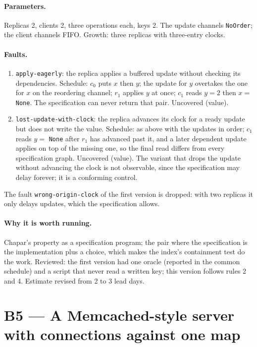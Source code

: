 \documentclass[11pt,a4paper]{article}
\newcommand{\code}[1]{\texttt{#1}}
\begin{document}
\paragraph{Parameters.} Replicas 2, clients 2, three operations each, keys 2. The update
channels \code{NoOrder}; the client channels FIFO. Growth: three replicas with three-entry clocks.

\paragraph{Faults.}
\begin{enumerate}
  \item \code{apply-eagerly}: the replica applies a buffered update without checking its
        dependencies. Schedule: $c_0$ puts $x$ then $y$; the update for $y$ overtakes the one
        for $x$ on the reordering channel; $r_1$ applies $y$ at once; $c_1$ reads $y = 2$ then
        $x = $ \code{None}. The specification can never return that pair. Uncovered (value).
  \item \code{lost-update-with-clock}: the replica advances its clock for a ready update but
        does not write the value. Schedule: as above with the updates in order; $c_1$ reads
        $y = $ \code{None} after $r_1$ has advanced past it, and a later dependent update applies
        on top of the missing one, so the final read differs from every specification graph.
        Uncovered (value). The variant that drops the update without advancing the clock is
        not observable, since the specification may delay forever; it is a conforming control.
\end{enumerate}
The fault \code{wrong-origin-clock} of the first version is dropped: with two replicas it only
delays updates, which the specification allows.

\paragraph{Why it is worth running.} Chapar's property as a specification program; the pair
where the specification is the implementation plus a choice, which makes the index's
containment test do the work. Reviewed: the first version had one oracle (reported in the
common schedule) and a script that never read a written key; this version follows rules 2 and 4.
Estimate revised from 2 to 3 lead days.

\section{B5 --- A Memcached-style server with connections against one map}
\end{document}
